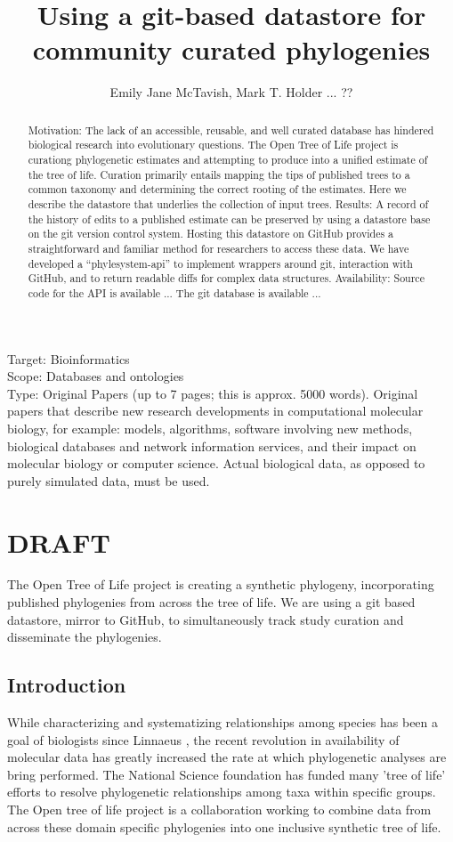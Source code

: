 \documentclass[a4paper,10pt]{article}
\title{Using a git-based datastore for community curated phylogenies}
\author{Emily Jane McTavish, Mark T. Holder ... ??}
\begin{document}
\maketitle

Target: Bioinformatics\\
Scope: Databases and ontologies\\
Type: Original Papers (up to 7 pages; this is approx. 5000 words).
Original papers that describe new research developments in computational molecular biology, for example: 
models, algorithms, software involving new methods, biological databases and network information services, and their impact on molecular biology or computer science. 
Actual biological data, as opposed to purely simulated data, must be used.


\begin{abstract}
Motivation:
The lack of an accessible, reusable, and well curated database has hindered biological research into evolutionary questions.
The Open Tree of Life project is curationg phylogenetic estimates and attempting to produce into a unified estimate of the tree of life. 
Curation primarily entails mapping the tips of published trees to a common taxonomy and determining the correct rooting of the estimates.
Here we describe the datastore that underlies the collection of input trees.
Results:
A record of the history of edits to a published estimate can be preserved by using a datastore base on the git version control system.
Hosting this datastore on GitHub provides a straightforward and familiar method for researchers to access these data. 
We have developed a ``phylesystem-api'' to implement wrappers around git, interaction with GitHub, and to return readable diffs for complex data structures.
Availability:
Source code for the API is available ...
The git database is available ...
\end{abstract}

\section{DRAFT}
The Open Tree of Life project is creating a synthetic phylogeny, incorporating published phylogenies from across the tree of life.
We are using a git based datastore, mirror to GitHub, to simultaneously track study curation and disseminate the phylogenies.


\subsection{Introduction}
 While characterizing and systematizing relationships among species has been a goal of biologists since Linnaeus \cite{Linneaus}, 
 the recent revolution in availability of molecular data has greatly increased the rate at which phylogenetic analyses are bring performed.
 The National Science foundation has funded many 'tree of life' efforts to resolve phylogenetic relationships among taxa within specific groups.
 The Open tree of life project is a collaboration working to combine data from across these domain specific phylogenies into one inclusive synthetic tree of life.
 
\end{document}
